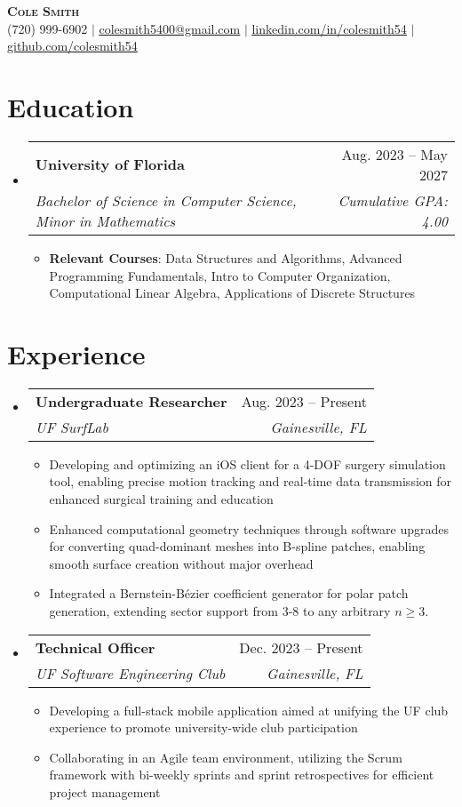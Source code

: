 \documentclass[letterpaper,12pt]{article}
\makeatletter
\newcommand{\resumeItem}[1]{
  \item\small{
    {#1 \vspace{-2pt}}
  }
}
\newcommand{\resumeSubheading}[4]{
  \vspace{-2pt}\item
    \begin{tabular*}{0.97\textwidth}[t]{l@{\extracolsep{\fill}}r}
      \textbf{#1} & #2 \\
      \textit{\small#3} & \textit{\small #4} \\
    \end{tabular*}\vspace{-7pt}
}
\newcommand{\resumeSubHeadingListStart}{\begin{itemize}[leftmargin=0.15in, label={}]}
\newcommand{\resumeSubHeadingListEnd}{\end{itemize}}
\newcommand{\resumeItemListStart}{\begin{itemize}}
\newcommand{\resumeItemListEnd}{\end{itemize}\vspace{-5pt}}
\makeatother
\begin{document}
\begin{center}
    \textbf{\Huge \scshape Cole Smith} \\ \vspace{1pt}
    \small (720) 999-6902 $|$ \href{mailto:colesmith5400@gmail.com}{\underline{colesmith5400@gmail.com}} $|$ 
    \href{https://linkedin.com/in/colesmith54}{\underline{linkedin.com/in/colesmith54}} $|$
    \href{https://github.com/colesmith54}{\underline{github.com/colesmith54}}
\end{center}


\section{Education}
  \resumeSubHeadingListStart
    \resumeSubheading
      {University of Florida}{Aug. 2023 -- May 2027}
      {Bachelor of Science in Computer Science, Minor in Mathematics}{Cumulative GPA: 4.00}
      \resumeItemListStart
        \resumeItem{\textbf{Relevant Courses}: Data Structures and Algorithms, Advanced Programming Fundamentals, Intro to Computer Organization, Computational Linear Algebra, Applications of Discrete Structures}
      \resumeItemListEnd
  \resumeSubHeadingListEnd


\section{Experience}
  \resumeSubHeadingListStart
    \resumeSubheading
      {Undergraduate Researcher}{Aug. 2023 -- Present}
      {UF SurfLab}{Gainesville, FL}
      \resumeItemListStart
        \resumeItem{Developing and optimizing an iOS client for a 4-DOF  surgery simulation tool, enabling precise motion tracking and real-time data transmission for enhanced surgical training and education}
        \resumeItem{Enhanced computational geometry techniques through software upgrades for converting quad-dominant meshes into B-spline patches, enabling smooth surface creation without major overhead}
        \resumeItem{Integrated a Bernstein-Bézier coefficient generator for polar patch generation, extending sector support from 3-8 to any arbitrary $n \geq 3$.}
      \resumeItemListEnd
    \resumeSubheading
      {Technical Officer}{Dec. 2023 -- Present}
      {UF Software Engineering Club}{Gainesville, FL}
      \resumeItemListStart
        \resumeItem{Developing a full-stack mobile application aimed at unifying the UF club experience to promote university-wide club participation}
        \resumeItem{Collaborating in an Agile team environment, utilizing the Scrum framework with bi-weekly sprints and sprint retrospectives for efficient project management}
      \resumeItemListEnd
  \resumeSubHeadingListEnd
\end{document}
